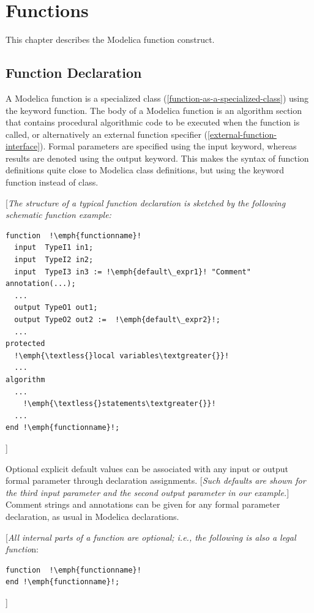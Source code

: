 \documentclass[10pt,a4paper]{report}
\def\doublelabel#1{\label{#1}}
\begin{document}
\chapter{Functions}\doublelabel{functions}

This chapter describes the Modelica function construct.

\section{Function Declaration}\doublelabel{function-declaration}

A Modelica function is a specialized class (\ref{function-as-a-specialized-class}) using the
keyword function. The body of a Modelica function is an algorithm
section that contains procedural algorithmic code to be executed when
the function is called, or alternatively an external function specifier
(\ref{external-function-interface}). Formal parameters are specified using the input keyword,
whereas results are denoted using the output keyword. This makes the
syntax of function definitions quite close to Modelica class
definitions, but using the keyword function instead of class.

{[}\emph{The structure of a typical function declaration is sketched by
the following schematic function example:}


\begin{lstlisting}[language=modelica,escapechar=!]
function  !\emph{functionname}!
  input  TypeI1 in1;  
  input  TypeI2 in2;
  input  TypeI3 in3 := !\emph{default\_expr1}! "Comment" annotation(...);   
  ...   
  output TypeO1 out1;
  output TypeO2 out2 :=  !\emph{default\_expr2}!;
  ... 
protected   
  !\emph{\textless{}local variables\textgreater{}}!   
  ... 
algorithm   
  ...   
    !\emph{\textless{}statements\textgreater{}}!   
  ... 
end !\emph{functionname}!; 
\end{lstlisting}

{]}

Optional explicit default values can be associated with any input or
output formal parameter through declaration assignments. {[}\emph{Such
defaults are shown for the third input parameter and the second output
parameter in our example.}{]} Comment strings and annotations can be
given for any formal parameter declaration, as usual in Modelica
declarations.

{[}\emph{All internal parts of a function are optional; i.e., the
following is also a legal functio}n:

\begin{lstlisting}[language=modelica,escapechar=!]
function  !\emph{functionname}!
end !\emph{functionname}!; 
\end{lstlisting}
{]}
\end{document}
